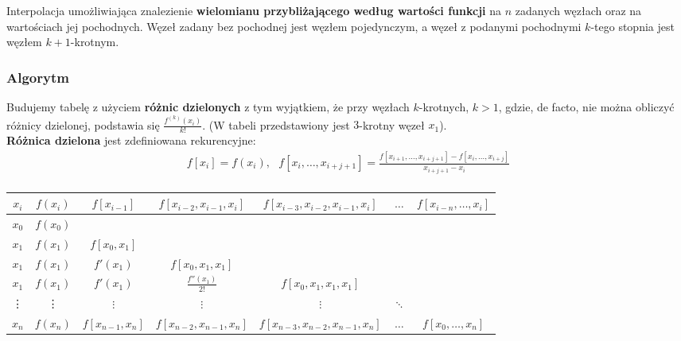 \documentclass[main.tex]{subfiles}
\begin{document}
    Interpolacja umożliwiająca znalezienie \textbf{wielomianu przybliżającego według wartości funkcji} na $n$ zadanych węzłach
    oraz na wartościach jej pochodnych.
    Węzeł zadany bez pochodnej jest węzłem pojedynczym, a węzeł z podanymi pochodnymi $k$-tego stopnia jest węzłem
    $k+1$-krotnym.

    \subsubsection{Algorytm}

    Budujemy tabelę z użyciem \textbf{różnic dzielonych} z tym wyjątkiem, że przy węzłach $k$-krotnych, $k>1$, gdzie,
    de facto, nie można obliczyć różnicy dzielonej, podstawia się $\frac{f^{(k)}(x_i)}{k!}$. (W tabeli przedstawiony jest
    $3$-krotny węzeł $x_{1}$).\\

    \textbf{Różnica dzielona} jest zdefiniowana rekurencyjne:
    \begin{gather*}
        f[x_{i}]=f(x_{i}), ~~~
        f[x_{i},\ldots ,x_{i+j+1}]= \frac {f[x_{i+1},\ldots ,x_{i+j+1}]-f[x_{i},\ldots ,x_{i+j}]}{x_{i+j+1}-x_{i}}\\
    \end{gather*}


    \begin{tabular}{|c|c|cccll}
        \hline
        $x_i$ &
        $f(x_i)$ &
        \multicolumn{1}{c|}{$f[x_{i-1}]$} &
        \multicolumn{1}{c|}{$f[x_{i-2},x_{i-1},x_i]$} &
        \multicolumn{1}{c|}{$f[x_{i-3},x_{i-2},x_{i-1},x_i]$} &
        \multicolumn{1}{c|}{$\dots$} &
        \multicolumn{1}{c|}{$f[x_{i-n},\dots,x_i]$} \\ \hline
        $x_0$ &
        $f(x_0)$ &
        &
        &
        \multicolumn{1}{l}{} &
        &
        \\ \cline{1-3}
        $x_1$ &
        $f(x_1)$ &
        \multicolumn{1}{c|}{$f[x_0,x_1]$} &
        &
        \multicolumn{1}{l}{} &
        &
        \\ \cline{1-4}
        $x_1$ &
        $f(x_1)$ &
        \multicolumn{1}{c|}{$f'(x_1)$} &
        \multicolumn{1}{c|}{$f[x_0,x_1,x_1]$} &
        \multicolumn{1}{l}{} &
        &
        \\ \cline{1-5}
        $x_1$ &
        $f(x_1)$ &
        \multicolumn{1}{c|}{$f'(x_1)$} &
        \multicolumn{1}{c|}{$\frac{f''(x_1)}{2!}$} &
        \multicolumn{1}{c|}{$f[x_0,x_1,x_1,x_1]$} &
        &
        \\ \cline{1-6}
        \vdots &
        \vdots &
        \multicolumn{1}{c|}{$\vdots$} &
        \multicolumn{1}{c|}{$\vdots$} &
        \multicolumn{1}{c|}{$\vdots$} &
        \multicolumn{1}{c|}{$\ddots$} &
        \\ \hline
        $x_n$ &
        $f(x_n)$ &
        \multicolumn{1}{c|}{$f[x_{n-1},x_n]$} &
        \multicolumn{1}{c|}{$f[x_{n-2},x_{n-1},x_n]$} &
        \multicolumn{1}{c|}{$f[x_{n-3},x_{n-2},x_{n-1},x_n]$} &
        \multicolumn{1}{c|}{$\dots$} &
        \multicolumn{1}{c|}{$f[x_0,\dots,x_n]$} \\ \hline
    \end{tabular}\\\\
\end{document}
